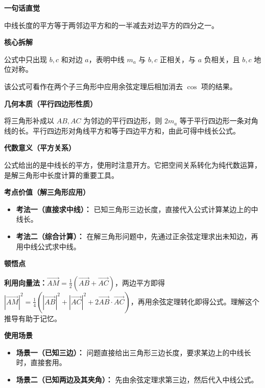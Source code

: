 \begin{explanationbox}
	\textbf{\textcolor{CExplanation}{一句话直觉}}

	中线长度的平方等于两邻边平方和的一半减去对边平方的四分之一。

	\medskip
	\textbf{\textcolor{CExplanation}{核心拆解}}
	\begin{description}[style=nextline, leftmargin=2.8em, labelsep=0.5em, itemsep=0.45em]
		\item[\textbf{要点一（对称结构）：}] 公式中只出现 $b,c$ 和对边 $a$，表明中线 $m_a$ 与 $b,c$ 正相关，与 $a$ 负相关，且 $b,c$ 地位对称。
		\item[\textbf{要点二（与余弦定理关联）：}] 该公式可看作在两个子三角形中应用余弦定理后相加消去 $\cos$ 项的结果。
	\end{description}

	\medskip
	\textbf{\textcolor{CExplanation}{几何本质（平行四边形性质）}}

	将三角形补成以 $AB,AC$ 为邻边的平行四边形，则 $2m_a$ 等于平行四边形一条对角线的长。平行四边形对角线平方和等于四边平方和，由此可得中线长公式。

	\medskip
	\textbf{\textcolor{CExplanation}{代数意义（平方关系）}}

	公式给出的是中线长的平方，使用时注意开方。它把空间关系转化为纯代数运算，是解三角形中长度计算的重要工具。

	\medskip
	\textbf{\textcolor{CExplanation}{考点价值（解三角形应用）}}
	\begin{itemize}[leftmargin=*, itemsep=0.5em, topsep=0.4em]
		\item \textbf{考法一（直接求中线）：} 已知三角形三边长度，直接代入公式计算某边上的中线长。
		\item \textbf{考法二（综合计算）：} 在解三角形问题中，先通过正余弦定理求出未知边，再用中线公式求中线。
	\end{itemize}

	\medskip
	\textbf{\textcolor{CExplanation}{顿悟点}}

	\textbf{利用向量法：}$\overrightarrow{AM} = \frac{1}{2}(\overrightarrow{AB}+\overrightarrow{AC})$，两边平方即得 $|\overrightarrow{AM}|^2 = \frac{1}{4}(|\overrightarrow{AB}|^2+|\overrightarrow{AC}|^2+2\overrightarrow{AB}\cdot\overrightarrow{AC})$，再用余弦定理转化即得公式。理解这个推导有助于记忆。

	\medskip
	\textbf{\textcolor{CExplanation}{使用场景}}
	\begin{itemize}[leftmargin=*, itemsep=0.5em, topsep=0.4em]
		\item \textbf{场景一（已知三边）：} 问题直接给出三角形三边长度，要求某边上的中线长时，直接套用。
		\item \textbf{场景二（已知两边及其夹角）：} 先由余弦定理求第三边，然后代入中线公式。
	\end{itemize}
\end{explanationbox}
